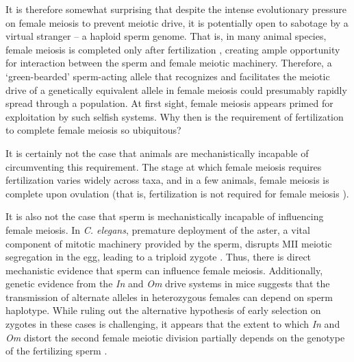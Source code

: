 \documentclass[12pt,letterpaper]{article}
\begin{document}
It is therefore somewhat surprising that despite the intense evolutionary pressure on female meiosis to prevent meiotic drive, 
it is potentially open to sabotage by a virtual stranger -- a haploid sperm genome.
That is, in many animal species, female meiosis is completed only after fertilization \citep{Masui_book}, 
creating ample opportunity for interaction between the sperm and female meiotic machinery. 
Therefore, a `green-bearded' \citep{Gardner2010} sperm-acting allele that recognizes and facilitates the meiotic drive of a genetically equivalent allele in female meiosis %
     could presumably rapidly spread through a population. 
At first sight, female meiosis appears primed for exploitation by such selfish systems.  
Why then is the requirement of fertilization to complete female meiosis so ubiquitous? 

It is certainly not the case that animals are mechanistically incapable of circumventing this requirement.
The stage at which female meiosis requires fertilization varies widely across taxa, and in a few animals, 
	female meiosis is complete upon ovulation (that is, fertilization is not required for female meiosis \citep[see table 1 of ref 
][]{Masui_book}). 

It is also not the case that sperm is mechanistically incapable of influencing female meiosis.
In \emph{C. elegans}, premature deployment of the aster, a vital component of mitotic
machinery provided by the sperm, disrupts MII meiotic segregation
in the egg, leading to a triploid zygote \citep{McNally2012}. 
Thus, there is direct mechanistic evidence that sperm can influence female meiosis.
 Additionally, genetic evidence from the \emph{In} and \emph{Om}  drive systems in mice suggests that the 
 transmission of alternate alleles in heterozygous females can depend on sperm haplotype.  
 While ruling out the alternative hypothesis of early selection on zygotes \citep[pages
52-54][]{Burt2006} in these cases is challenging, it appears that the extent to which \emph{In} and \emph{Om} distort the second female meiotic division partially depends on the genotype of the fertilizing sperm \citep{Agulnik1993,Wu2005}.  
\end{document}
